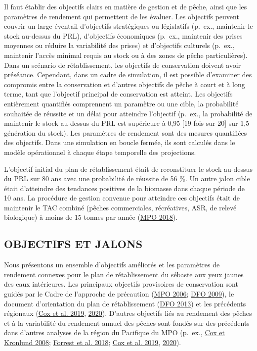 \documentclass[french,11pt]{book}
\begin{document}
Il faut établir des objectifs clairs en matière de gestion et de pêche, ainsi que les paramètres de rendement qui permettent de les évaluer. Les objectifs peuvent couvrir un large éventail d'objectifs stratégiques ou législatifs (p.~ex., maintenir le stock au-dessus du PRL), d'objectifs économiques (p.~ex., maintenir des prises moyennes ou réduire la variabilité des prises) et d'objectifs culturels (p.~ex., maintenir l'accès minimal requis au stock ou à des zones de pêche particulières). Dans un scénario de rétablissement, les objectifs de conservation doivent avoir préséance. Cependant, dans un cadre de simulation, il est possible d'examiner des compromis entre la conservation et d'autres objectifs de pêche à court et à long terme, tant que l'objectif principal de conservation est atteint. Les objectifs entièrement quantifiés comprennent un paramètre ou une cible, la probabilité souhaitée de réussite et un délai pour atteindre l'objectif (p.~ex., la probabilité de maintenir le stock au-dessus du PRL est supérieure à 0,95 {[}19 fois sur 20{]} sur 1,5 génération du stock). Les paramètres de rendement sont des mesures quantifiées des objectifs. Dans une simulation en boucle fermée, ils sont calculés dans le modèle opérationnel à chaque étape temporelle des projections.

L'objectif initial du plan de rétablissement était de reconstituer le stock au-dessus du PRL sur 80 ans avec une probabilité de réussite de 56 \%. Un autre jalon cible était d'atteindre des tendances positives de la biomasse dans chaque période de 10 ans. La procédure de gestion convenue pour atteindre ces objectifs était de maintenir le TAC combiné (pêches commerciales, récréatives, ASR, de relevé biologique) à moins de 15 tonnes par année (\protect\hyperlink{ref-ifmp2018}{MPO 2018}).

\hypertarget{sec:objectives-metrics-obj}{%
\subsection{OBJECTIFS ET JALONS}\label{sec:objectives-metrics-obj}}

Nous présentons un ensemble d'objectifs améliorés et les paramètres de rendement connexes pour le plan de rétablissement du sébaste aux yeux jaunes des eaux intérieures. Les principaux objectifs provisoires de conservation sont guidés par le Cadre de l'approche de précaution (\protect\hyperlink{ref-dfo2006}{MPO 2006}; \protect\hyperlink{ref-dfo2009}{DFO 2009}), le document d'orientation du plan de rétablissement (\protect\hyperlink{ref-dfo2013}{DFO 2013}) et les précédents régionaux (\protect\hyperlink{ref-cox2019}{Cox et al. 2019}, \protect\hyperlink{ref-cox2020}{2020}). D'autres objectifs liés au rendement des pêches et à la variabilité du rendement annuel des pêches sont fondés sur des précédents dans d'autres analyses de la région du Pacifique du MPO (p.~ex., \protect\hyperlink{ref-cox2008a}{Cox et Kronlund 2008}; \protect\hyperlink{ref-forrest2018}{Forrest et al. 2018}; \protect\hyperlink{ref-cox2019}{Cox et al. 2019}, \protect\hyperlink{ref-cox2020}{2020}).
\end{document}
